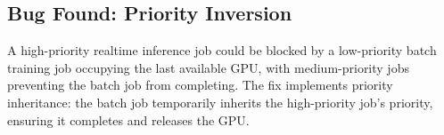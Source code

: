 \subsection{Bug Found: Priority Inversion}

A high-priority realtime inference job could be blocked by a low-priority
batch training job occupying the last available GPU, with medium-priority jobs
preventing the batch job from completing. The fix implements priority
inheritance: the batch job temporarily inherits the high-priority job's
priority, ensuring it completes and releases the GPU.

